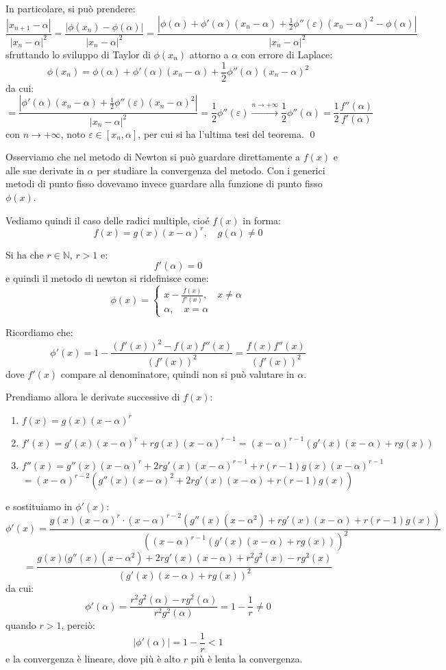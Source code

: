 \documentclass[a4paper,11pt]{article}
\begin{document}
In particolare, si può prendere:
$$
\frac{|x_{n + 1} - \alpha|}{|x_n - \alpha|^2} = \frac{|\phi(x_n) - \phi(\alpha)|}{|x_n - \alpha|^2} 
= \frac{ | \phi(\alpha) + \phi'(\alpha) (x_n - \alpha) + \frac{1}{2} \phi''(\varepsilon) (x_n - \alpha)^2 - \phi(\alpha) | }{ |x_n - \alpha|^2 }
$$
sfruttando lo sviluppo di Taylor di $\phi(x_n)$ attorno a $\alpha$ con errore di Laplace:
$$
\phi(x_n) = \phi(\alpha) + \phi'(\alpha) (x_n - \alpha) + \frac{1}{2} \phi''(\alpha) (x_n - \alpha)^2
$$
da cui:
$$
= \frac{ | \phi'(\alpha) (x_n - \alpha) + \frac{1}{2} \phi''(\varepsilon) (x_n - \alpha)^2 | }{ |x_n - \alpha|^2 }
= \frac{1}{2} \phi''(\varepsilon) \xrightarrow{n \rightarrow +\infty} \frac{1}{2} \phi''(\alpha) = \frac{1}{2} \frac{f''(\alpha)}{f'(\alpha)}
$$
con $n \rightarrow +\infty$, noto $\varepsilon \in [x_n, \alpha]$, per cui si ha l'ultima tesi del teorema. \qed

Osserviamo che nel metodo di Newton si può guardare direttamente a $f(x)$ e alle sue derivate in $\alpha$ per studiare la convergenza del metodo.
Con i generici metodi di punto fisso dovevamo invece guardare alla funzione di punto fisso $\phi(x)$.

Vediamo quindi il caso delle radici multiple, cioé $f(x)$ in forma:
$$
f(x) = g(x) (x - \alpha)^r, \quad g(\alpha) \neq 0
$$

Si ha che $r \in \mathbb{N}$, $r > 1$ e:
$$
f'(\alpha) = 0
$$
e quindi il metodo di newton si ridefinisce come:
$$
\phi(x) =
	\begin{cases}
		x - \frac{f(x)}{f'(x)}, \quad x \neq \alpha \\ 
		\alpha,  \quad x = \alpha
	\end{cases}
$$

Ricordiamo che:
$$
\phi'(x) = 1 - \frac{(f'(x))^2 - f(x) f''(x)}{(f'(x))^2} = \frac{f(x) f''(x)}{(f'(x))^2}
$$
dove $f'(x)$ compare al denominatore, quindi non si può valutare in $\alpha$.

Prendiamo allora le derivate successive di $f(x)$:
\begin{enumerate}
	\item 
$
f(x) = g(x) (x - \alpha)^r
$
	\item 
$
f'(x) = g'(x) (x - \alpha)^r + r g(x) (x - \alpha)^{r - 1} = (x - \alpha)^{r - 1} ( g'(x)(x - \alpha) + r g(x) )
$
	\item
$
f''(x) = g''(x) (x - \alpha)^r + 2 r g'(x)(x - \alpha)^{r - 1} + r (r - 1) g(x) (x - \alpha)^{r - 1}
$ \\ 
$$
= (x - \alpha)^{r - 2} ( g''(x) (x - \alpha)^2 + 2 r g'(x) (x - \alpha) + r (r - 1) g(x) )
$$
\end{enumerate}
e sostituiamo in $\phi'(x)$:
$$
\phi'(x) = \frac{ g(x) (x - \alpha)^r \cdot (x - \alpha)^{r - 2} ( g''(x) (x - \alpha^2) + r g'(x) (x - \alpha) + r (r - 1) g(x) ) }{ ( (x - \alpha)^{r - 1} (g'(x) (x - \alpha) + r g(x) ) )^2 }
$$
$$
= \frac{g(x) (g''(x) (x - \alpha^2) + 2 r g'(x) (x - \alpha) + r^2 g^2(x) - r g^2(x) }{(g'(x)(x - \alpha) + r g(x))^2}
$$
da cui:
$$
\phi'(\alpha) = \frac{r^2 g^2(\alpha) - r g^2(\alpha)}{r^2 g^2(\alpha)} = 1 - \frac{1}{r} \neq 0
$$
quando $r > 1$, perciò:
$$
|\phi'(\alpha)| = 1 - \frac{1}{r} < 1
$$
e la convergenza è lineare, dove più è alto $r$ più è lenta la convergenza.
\end{document}

